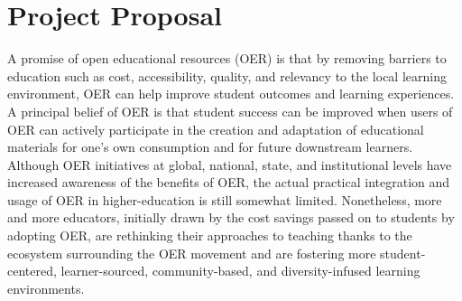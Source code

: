 \documentclass[11pt]{article}
\begin{document}
\section{Project Proposal}

A promise of open educational resources (OER) is that by removing barriers to education such as cost, accessibility, quality, and relevancy to the local learning environment, OER can help improve student outcomes and learning experiences.  A principal belief of OER is that student success can be improved when users of OER can actively participate in the creation and adaptation of educational materials for one's own consumption and for future downstream learners.  Although OER initiatives at global, national, state, and institutional levels have increased awareness of the benefits of OER, the actual practical integration and usage of OER in higher-education is still somewhat limited.  Nonetheless, more and more educators, initially drawn by the cost savings passed on to students by adopting OER, are rethinking their approaches to teaching thanks to the ecosystem surrounding the OER movement and are fostering more student-centered, learner-sourced, community-based, and diversity-infused learning environments.
\end{document}
